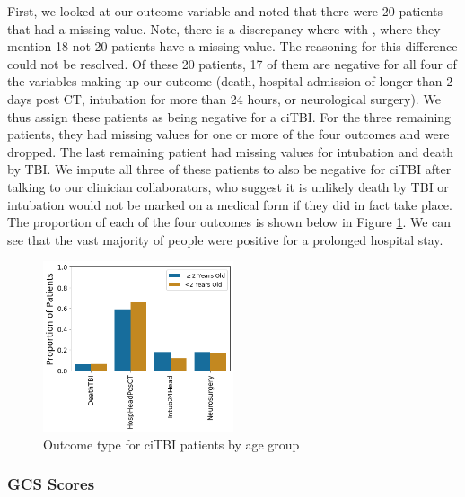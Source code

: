 \documentclass[11pt, letterpaper]{amsart}
\let\Oldsubsubsection\subsubsection
\renewcommand{\subsubsection}{\FloatBarrier\Oldsubsubsection}
\begin{document}
First, we looked at our outcome variable and noted that there were 20 patients that had a missing value. Note, there is a discrepancy where with \cite{kuppermann2009identification}, where they mention 18 not 20 patients have a missing value. The reasoning for this difference could not be resolved. Of these 20 patients, 17 of them are negative for all four of the variables making up our outcome (death, hospital admission of longer than 2 days post CT, intubation for more than 24 hours, or neurological surgery). We thus assign these patients as being negative for a ciTBI. For the three remaining patients, they had missing values for one or more of the four outcomes and were dropped. The last remaining patient had missing values for intubation and death by TBI. We impute all three of these patients to also be negative for ciTBI after talking to our clinician collaborators, who suggest it is unlikely death by TBI or intubation would not be marked on a medical form if they did in fact take place. The proportion of each of the four outcomes is shown below in Figure \ref{fig:outcome_type}. We can see that the vast majority of people were positive for a prolonged hospital stay.
\begin{figure}
	\centering
	\includegraphics[width=0.5\textwidth]{outcome_type.png}
	\caption{Outcome type for ciTBI patients by age group}\label{fig:outcome_type}
\end{figure}


\subsubsection{GCS Scores}
\end{document}
